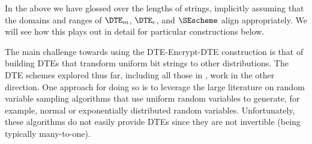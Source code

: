 In the above we have glossed over the lengths of strings, implicitly assuming
that the domains and ranges of $\DTE_m$, $\DTE_c$, and $\SEscheme$ align
appropriately. We will see how this plays out in detail for particular
constructions below.

The main challenge towards using the DTE-Encrypt-DTE construction is that of
building DTEs that transform uniform bit strings to other distributions. The DTE
schemes explored thus far, including all those in \cite{JR14}, work in the other
direction. One approach for doing so is to leverage the large literature on
random variable sampling algorithms that use uniform random variables to
generate, for example, normal or exponentially distributed random variables.
Unfortunately,  these algorithms do not easily provide DTEs since they are not
invertible (being typically many-to-one). 









